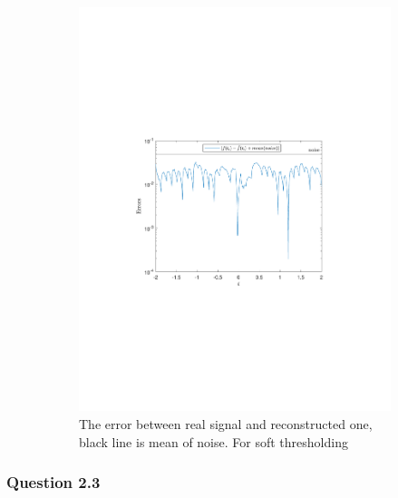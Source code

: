 \documentclass[a4paper]{article}
\begin{document}
\begin{figure}[H]
\begin{subfigure}{0.49\textwidth}
\includegraphics[trim={3.5cm 8cm 4cm 9cm},clip,width=1\textwidth]{Images/Delta=0.1Soft.pdf}
\caption{The error between real signal and reconstructed one, black line is mean of noise. For soft thresholding}
\label{sub:Delta=0.1BetterSoft}
\end{subfigure}
\caption{}
\label{fig:HardSoft}
\end{figure}


    \subsubsection{Question 2.3}
\end{document}
